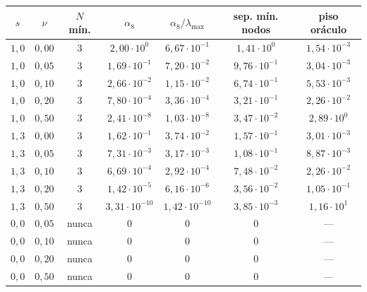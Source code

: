\begin{tabular}{ccccccc}
\toprule
$s$ & $\nu$ & $N$ mín. & $\alpha_{8}$ & $\alpha_{8}/\lambda_{\max}$ & sep. mín. nodos & piso oráculo \\
\midrule
$1{,}0$ & $0{,}00$ & 3 & $2{,}00 \cdot 10^{0}$ & $6{,}67 \cdot 10^{-1}$ & $1{,}41 \cdot 10^{0}$ & $1{,}54 \cdot 10^{-3}$ \\
$1{,}0$ & $0{,}05$ & 3 & $1{,}69 \cdot 10^{-1}$ & $7{,}20 \cdot 10^{-2}$ & $9{,}76 \cdot 10^{-1}$ & $3{,}04 \cdot 10^{-3}$ \\
$1{,}0$ & $0{,}10$ & 3 & $2{,}66 \cdot 10^{-2}$ & $1{,}15 \cdot 10^{-2}$ & $6{,}74 \cdot 10^{-1}$ & $5{,}53 \cdot 10^{-3}$ \\
$1{,}0$ & $0{,}20$ & 3 & $7{,}80 \cdot 10^{-4}$ & $3{,}36 \cdot 10^{-4}$ & $3{,}21 \cdot 10^{-1}$ & $2{,}26 \cdot 10^{-2}$ \\
$1{,}0$ & $0{,}50$ & 3 & $2{,}41 \cdot 10^{-8}$ & $1{,}03 \cdot 10^{-8}$ & $3{,}47 \cdot 10^{-2}$ & $2{,}89 \cdot 10^{0}$ \\
$1{,}3$ & $0{,}00$ & 3 & $1{,}62 \cdot 10^{-1}$ & $3{,}74 \cdot 10^{-2}$ & $1{,}57 \cdot 10^{-1}$ & $3{,}01 \cdot 10^{-3}$ \\
$1{,}3$ & $0{,}05$ & 3 & $7{,}31 \cdot 10^{-3}$ & $3{,}17 \cdot 10^{-3}$ & $1{,}08 \cdot 10^{-1}$ & $8{,}87 \cdot 10^{-3}$ \\
$1{,}3$ & $0{,}10$ & 3 & $6{,}69 \cdot 10^{-4}$ & $2{,}92 \cdot 10^{-4}$ & $7{,}48 \cdot 10^{-2}$ & $2{,}26 \cdot 10^{-2}$ \\
$1{,}3$ & $0{,}20$ & 3 & $1{,}42 \cdot 10^{-5}$ & $6{,}16 \cdot 10^{-6}$ & $3{,}56 \cdot 10^{-2}$ & $1{,}05 \cdot 10^{-1}$ \\
$1{,}3$ & $0{,}50$ & 3 & $3{,}31 \cdot 10^{-10}$ & $1{,}42 \cdot 10^{-10}$ & $3{,}85 \cdot 10^{-3}$ & $1{,}16 \cdot 10^{1}$ \\
$0{,}0$ & $0{,}05$ & nunca & $0$ & $0$ & $0$ & --- \\
$0{,}0$ & $0{,}10$ & nunca & $0$ & $0$ & $0$ & --- \\
$0{,}0$ & $0{,}20$ & nunca & $0$ & $0$ & $0$ & --- \\
$0{,}0$ & $0{,}50$ & nunca & $0$ & $0$ & $0$ & --- \\
\bottomrule
\end{tabular}
